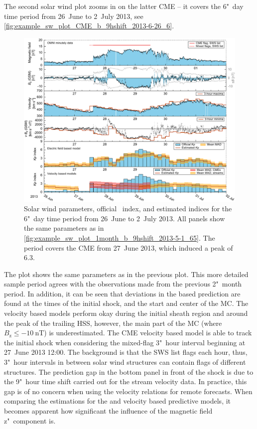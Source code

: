 The second solar wind plot zooms in on the latter CME -- it covers the 6"~day time period from 26~June to 2~July 2013, see \autoref{fig:example_sw_plot_CME_b_9hshift_2013-6-26_6}.
\begin{figure}[htb]
	\centering
	\includegraphics[width=\textwidth]{figures_of_mine/chapter2/example_sw_plot_CME_b_9hshift_2013-6-26_6.pdf}
	\caption[I created the figure myself.]
	{Solar wind parameters, official \Kp~index, and estimated \Kp{} indices for the 6"~day time period from 26~June to 2~July 2013. All panels show the same parameters as in \autoref{fig:example_sw_plot_1month_b_9hshift_2013-5-1_65}. The period covers the CME from 27~June 2013, which induced a peak \Kp{} of $6.3$.}
	\label{fig:example_sw_plot_CME_b_9hshift_2013-6-26_6}
\end{figure}
The plot shows the same parameters as in the previous plot. This more detailed sample period agrees with the observations made from the previous 2"~month period. In addition, it can be seen that deviations in the \vBz{} based \Kp{} prediction are found at the times of the initial shock, and the start and center of the MC. The velocity based models perform okay during the initial sheath region and around the peak of the trailing HSS, however, the main part of the MC (where $B_\text{z} \leq \SI{-10}{\nano\tesla}$) is underestimated. The CME velocity based model is able to track the initial shock when considering the mixed-flag 3"~hour interval beginning at 27~June 2013 12:00. The background is that the SWS list flags each hour, thus, 3"~hour intervals in between solar wind structures can contain flags of different structures. The prediction gap in the bottom panel in front of the shock is due to the 9"~hour time shift carried out for the stream velocity data. In practice, this gap is of no concern when using the velocity relations for remote \Kp{} forecasts.
When comparing the \Kp{} estimations for the \vBz{} and velocity based predictive models, it becomes apparent how significant the influence of the magnetic field z"~component is.


